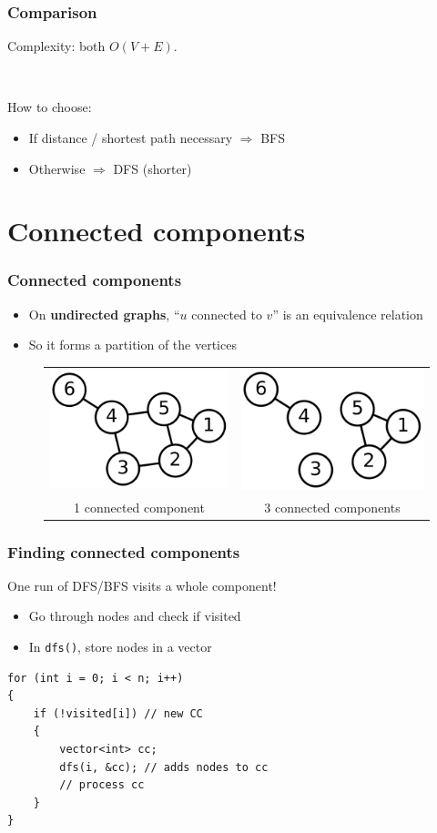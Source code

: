 \documentclass[12pt]{beamer}
\begin{document}
\begin{frame}
\frametitle{Comparison}
Complexity: both $O(V+E)$.

~

How to choose:
\begin{itemize}
\item If distance / shortest path necessary $\Rightarrow$ BFS
\item Otherwise $\Rightarrow$ DFS (shorter)
\end{itemize}
\end{frame}

\section{Connected components}

\begin{frame}
\frametitle{Connected components}
\begin{itemize}
\item On \textbf{undirected graphs}, ``$u$ connected to $v$'' is an equivalence relation
\item So it forms a partition of the vertices
\end{itemize}
\begin{figure}
\centering
\begin{tabular}{cc}
\includegraphics[width=0.4\linewidth]{img/6n-graph}
& \includegraphics[width=0.4\linewidth]{img/6n-3comp} \\
1 connected component & 3 connected components
\end{tabular}
\end{figure}
\end{frame}

\begin{frame}[fragile]
\frametitle{Finding connected components}
One run of DFS/BFS visits a whole component!
\begin{itemize}
\item Go through nodes and check if visited
\item In \texttt{dfs()}, store nodes in a vector
\end{itemize}
\begin{lstlisting}
for (int i = 0; i < n; i++)
{
    if (!visited[i]) // new CC
    {
        vector<int> cc;
        dfs(i, &cc); // adds nodes to cc
        // process cc
    }
}
\end{lstlisting}
\end{frame}
\end{document}
